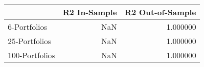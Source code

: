 \begin{tabular}{lrr}
\toprule
 & R2 In-Sample & R2 Out-of-Sample \\
\midrule
6-Portfolios & NaN & 1.000000 \\
25-Portfolios & NaN & 1.000000 \\
100-Portfolios & NaN & 1.000000 \\
\bottomrule
\end{tabular}
